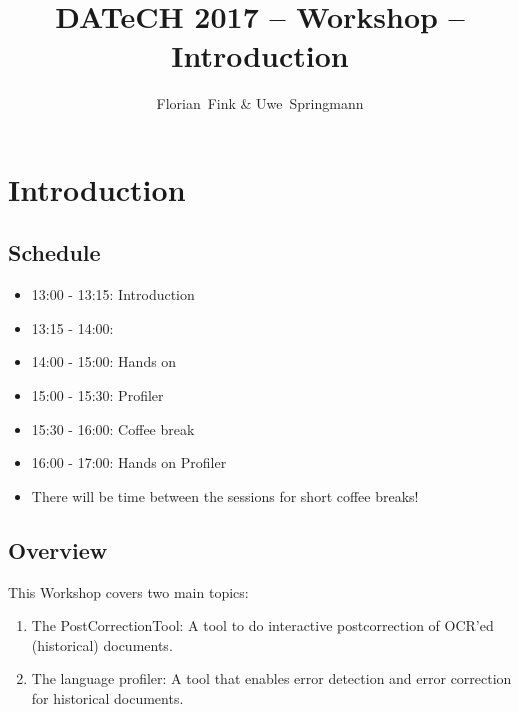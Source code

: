 
\title{DATeCH 2017 -- \pocoto{} Workshop -- Introduction}
\author{Florian~Fink \& Uwe~Springmann}



\begin{frame}
	\titlepage
\end{frame}

\section{Introduction}
\subsection{Schedule}
\begin{frame}
	\begin{itemize}
		\item 13:00 - 13:15: Introduction
		\item 13:15 - 14:00: \pocoto{}
		\item 14:00 - 15:00: Hands on \pocoto{}
		\item 15:00 - 15:30: Profiler
		\item 15:30 - 16:00: Coffee break
		\item 16:00 - 17:00: Hands on Profiler
		\item There will be time between the sessions for short coffee breaks!
	\end{itemize}
\end{frame}

\subsection{Overview}
\begin{frame}
	This Workshop covers two main topics:
	\begin{enumerate}
		\item The \pocoto{} PostCorrectionTool: A tool to do interactive
			postcorrection of OCR'ed (historical) documents.
		\item The language profiler: A tool that enables error detection and error
			correction for historical documents.
	\end{enumerate}
\end{frame}

